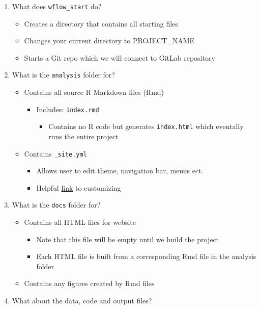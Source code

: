 \documentclass[]{book}
\providecommand{\tightlist}{%
  \setlength{\itemsep}{0pt}\setlength{\parskip}{0pt}}
\begin{document}
\begin{enumerate}
\def\labelenumi{\arabic{enumi}.}
\tightlist
\item
  What does \texttt{wflow\_start} do?

  \begin{itemize}
  \tightlist
  \item
    Creates a directory that contains all starting files
  \item
    Changes your current directory to PROJECT\_NAME
  \item
    Starts a Git repo which we will connect to GitLab repository
  \end{itemize}
\item
  What is the \texttt{analysis} folder for?

  \begin{itemize}
  \tightlist
  \item
    Contains all source R Markdown files (Rmd)

    \begin{itemize}
    \tightlist
    \item
      Includes: \texttt{index.rmd}

      \begin{itemize}
      \tightlist
      \item
        Contains no R code but generates \texttt{index.html} which eventally runs the entire project
      \end{itemize}
    \end{itemize}
  \item
    Contains \texttt{\_site.yml}

    \begin{itemize}
    \tightlist
    \item
      Allows user to edit theme, navigation bar, menus ect.
    \item
      Helpful \href{https://bookdown.org/yihui/rmarkdown/rmarkdown-site.html}{link} to customizing
    \end{itemize}
  \end{itemize}
\item
  What is the \texttt{docs} folder for?

  \begin{itemize}
  \tightlist
  \item
    Contains all HTML files for website

    \begin{itemize}
    \tightlist
    \item
      Note that this file will be empty until we build the project
    \item
      Each HTML file is built from a corresponding Rmd file in the analysis folder
    \end{itemize}
  \item
    Contains any figures created by Rmd files
  \end{itemize}
\item
  What about the data, code and output files?


\end{enumerate}
\end{document}
